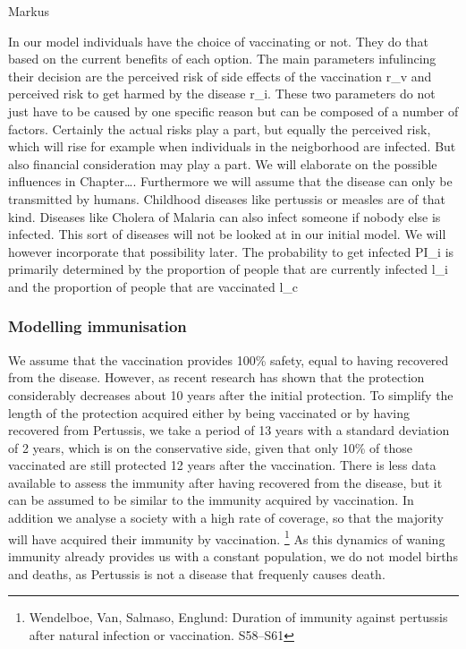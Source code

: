 \documentclass[11pt]{article}
\begin{document}
Markus
\vspace{14px}

In our model individuals have the choice of vaccinating or not. They do that based on the current benefits of each option. The main parameters infulincing their decision are the perceived risk of side effects of the vaccination r\_v and perceived risk to get harmed by the disease r\_i. 
These two parameters do not just have to be caused by one specific reason but can be composed of a number of factors. Certainly the actual risks play a part, but equally the perceived risk, which will rise for example when individuals in the neigborhood are infected. But also financial consideration may play a part. We will elaborate on the possible influences in Chapter….
Furthermore we will assume that the disease can only be transmitted by humans. Childhood diseases like pertussis or measles are of that kind. Diseases like Cholera of Malaria can also infect someone if nobody else is infected. This sort of diseases will not be looked at in our initial model. We will however incorporate that possibility later. 
The probability to get infected PI\_i is primarily determined by the proportion of people that are currently infected l\_i and the proportion of people that are vaccinated l\_c


\subsubsection{Modelling immunisation}
We assume that the vaccination provides 100\% safety, equal to having recovered from the disease. However, as recent research has shown that the protection considerably decreases about 10  years after the initial protection. 
To simplify the length of the protection acquired either by being vaccinated or by having recovered from Pertussis, we take a period of 13 years with a standard deviation of 2 years, which is on the conservative side, given that only 10\% of those vaccinated are still protected 12 years after the vaccination. There is less data available to assess the immunity after having recovered from the disease, but it can be assumed to be similar to the immunity acquired by vaccination. In addition we analyse a society with a high rate of coverage, so that the majority will have acquired their immunity by vaccination. \footnote{Wendelboe, Van, Salmaso, Englund: Duration of immunity against pertussis after natural infection or vaccination. S58–S61} 
As this dynamics of waning immunity already provides us with a constant population, we do not model births and deaths, as Pertussis is not a disease that frequenly causes death. 
\end{document}
